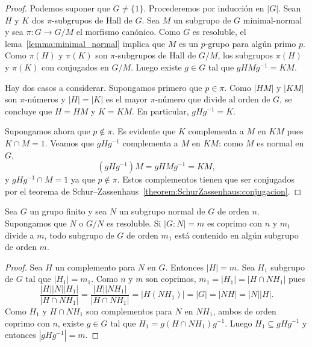\begin{proof}
	Podemos suponer que $G\ne\{1\}$. Procederemos por inducción en $|G|$.  Sean $H$
	y $K$ dos $\pi$-subgrupos de Hall de $G$. Sea $M$ un subgrupo de $G$
	minimal-normal y sea $\pi\colon G\to G/M$ el morfismo canónico. Como $G$ es
	resoluble, el lema~\ref{lemma:minimal_normal} implica que  $M$ es un
	$p$-grupo para algún primo $p$.  Como $\pi(H)$ y $\pi(K)$ son
	$\pi$-subgrupos de Hall de $G/M$, los subgrupos $\pi(H)$ y $\pi(K)$ con
	conjugados en $G/M$. Luego existe $g\in G$ tal que $gHMg^{-1}=KM$. 

	Hay dos casos a considerar. Supongamos primero que $p\in\pi$. Como $|HM|$ y
	$|KM|$ son $\pi$-números y $|H|=|K|$ es el mayor $\pi$-número que divide al
	orden de $G$, se concluye que $H=HM$ y $K=KM$. En particular, $gHg^{-1}=K$. 

	Supongamos ahora que $p\not\in\pi$. Es evidente que $K$ complementa a $M$ en
	$KM$ pues $K\cap M=1$. Veamos que $gHg^{-1}$ complementa a $M$ en $KM$:
	como $M$ es normal en $G$, 
	\[
	(gHg^{-1})M=gHMg^{-1}=KM,
	\]
	y $gHg^{-1}\cap M=1$ ya que $p\not\in\pi$. Estos complementos tienen que
	ser conjugados por el teorema de
	Schur--Zassenhaus~\ref{theorem:SchurZassenhaus:conjugacion}.
\end{proof}

\begin{corollary}
	Sea $G$ un grupo finito y sea $N$ un subgrupo normal de $G$ de orden $n$.
	Supongamos que $N$ o $G/N$ es resoluble. Si $|G:N|=m$ es coprimo con $n$ y
	$m_1$ divide a $m$, todo subgrupo de $G$ de orden $m_1$ está contenido en
	algún subgrupo de orden $m$.
\end{corollary}

\begin{proof}
	Sea $H$ un complemento para $N$ en $G$. Entonces $|H|=m$. Sea $H_1$
	subgrupo de $G$ tal que $|H_1|=m_1$. 
	Como $n$ y $m$ son coprimos, $m_1=|H_1|=|H\cap NH_1|$ pues
	\[
	\frac{|H||N||H_1|}{|H\cap NH_1|}=
	\frac{|H||NH_1|}{|H\cap NH_1|}=|H(NH_1)|=|G|=|NH|=|N||H|.
	\]
	Como $H_1$ y $H\cap NH_1$ son complementos para $N$ en $NH_1$, ambos de
	orden coprimo con $n$, existe $g\in G$ tal que $H_1=g(H\cap NH_1)g^{-1}$. Luego 
	$H_1\subseteq gHg^{-1}$ y entonces $|gHg^{-1}|=m$. 
\end{proof}

